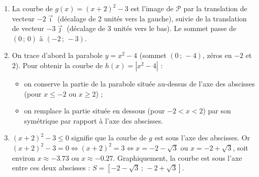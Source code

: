 \documentclass[11pt]{article}
\begin{document}
\begin{corrige}
\begin{enumerate}
\item La courbe de $g(x)=(x+2)^2-3$ est l'image de $\mathcal{P}$ par la translation de vecteur $-2\vec{\imath}$ (décalage de 2 unités vers la gauche), suivie de la translation de vecteur $-3\vec{\jmath}$ (décalage de 3 unités vers le bas). Le sommet passe de $(0\,;\,0)$ à $(-2\,;\,-3)$.
\item On trace d'abord la parabole $y=x^2-4$ (sommet $(0\,;\,-4)$, zéros en $-2$ et $2$). Pour obtenir la courbe de $h(x)=|x^2-4|$ :
\begin{itemize}
\item on conserve la partie de la parabole située au-dessus de l'axe des abscisses (pour $x\leq -2$ ou $x\geq 2$) ;
\item on remplace la partie située en dessous (pour $-2<x<2$) par son symétrique par rapport à l'axe des abscisses.
\end{itemize}
\item $(x+2)^2-3\leq 0$ signifie que la courbe de $g$ est sous l'axe des abscisses. Or $(x+2)^2-3=0\iff (x+2)^2=3\iff x=-2-\sqrt{3}$ ou $x=-2+\sqrt{3}$, soit environ $x\approx -3.73$ ou $x\approx -0.27$. Graphiquement, la courbe est sous l'axe entre ces deux abscisses : $S=[-2-\sqrt{3}\,;\,-2+\sqrt{3}]$.
\end{enumerate}
\end{corrige}
\end{document}
